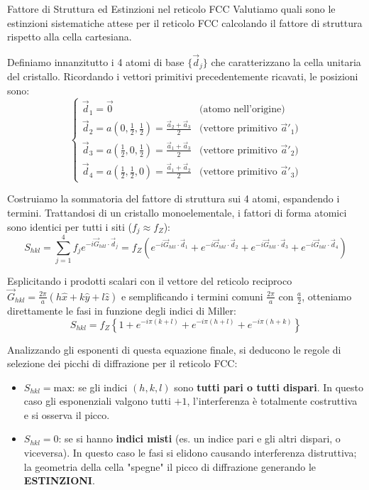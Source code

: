 \begin{note}{Fattore di Struttura ed Estinzioni nel reticolo FCC}{}
Valutiamo quali sono le estinzioni sistematiche attese per il reticolo FCC calcolando il fattore di struttura rispetto alla cella cartesiana. 

Definiamo innanzitutto i 4 atomi di base \(\{\vec{d}_j\}\) che caratterizzano la cella unitaria del cristallo. Ricordando i vettori primitivi precedentemente ricavati, le posizioni sono:
\begin{equation}
\begin{cases}
    \vec{d}_1 = \vec{0} & \text{(atomo nell'origine)} \\
    \vec{d}_2 = a(0, \frac{1}{2}, \frac{1}{2}) = \frac{\vec{a}_2 + \vec{a}_3}{2} & \text{(vettore primitivo } \vec{a}'_1 \text{)} \\
    \vec{d}_3 = a(\frac{1}{2}, 0, \frac{1}{2}) = \frac{\vec{a}_1 + \vec{a}_3}{2} & \text{(vettore primitivo } \vec{a}'_2 \text{)} \\
    \vec{d}_4 = a(\frac{1}{2}, \frac{1}{2}, 0) = \frac{\vec{a}_1 + \vec{a}_2}{2} & \text{(vettore primitivo } \vec{a}'_3 \text{)}
\end{cases}
\end{equation}

Costruiamo la sommatoria del fattore di struttura sui 4 atomi, espandendo i termini. Trattandosi di un cristallo monoelementale, i fattori di forma atomici sono identici per tutti i siti (\(f_j \approx f_Z\)):
\begin{equation}
    S_{hkl} = \sum_{j=1}^{4} f_j e^{-i\vec{G}_{hkl} \cdot \vec{d}_j} = f_Z \left( e^{-i\vec{G}_{hkl} \cdot \vec{d}_1} + e^{-i\vec{G}_{hkl} \cdot \vec{d}_2} + e^{-i\vec{G}_{hkl} \cdot \vec{d}_3} + e^{-i\vec{G}_{hkl} \cdot \vec{d}_4} \right)
\end{equation}

Esplicitando i prodotti scalari con il vettore del reticolo reciproco \(\vec{G}_{hkl} = \frac{2\pi}{a}(h\hat{x} + k\hat{y} + l\hat{z})\) e semplificando i termini comuni \(\frac{2\pi}{a}\) con \(\frac{a}{2}\), otteniamo direttamente le fasi in funzione degli indici di Miller:
\begin{equation}
    S_{hkl} = f_Z \left\{ 1 + e^{-i\pi(k+l)} + e^{-i\pi(h+l)} + e^{-i\pi(h+k)} \right\}
\end{equation}

Analizzando gli esponenti di questa equazione finale, si deducono le regole di selezione dei picchi di diffrazione per il reticolo FCC:
\begin{itemize}
    \item \(S_{hkl} = \text{max}\): se gli indici \((h,k,l)\) sono \textbf{tutti pari o tutti dispari}. In questo caso gli esponenziali valgono tutti \(+1\), l'interferenza è totalmente costruttiva e si osserva il picco.
    \item \(S_{hkl} = 0\): se si hanno \textbf{indici misti} (es. un indice pari e gli altri dispari, o viceversa). In questo caso le fasi si elidono causando interferenza distruttiva; la geometria della cella "spegne" il picco di diffrazione generando le \textbf{ESTINZIONI}.
\end{itemize}
\end{note}

